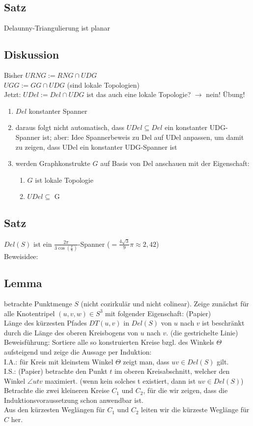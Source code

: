 \documentclass{article}
\begin{document}
\subsection*{Satz} Delaunny-Triangulierung ist planar

\subsection*{Diskussion}
Bisher $URNG := RNG \cap UDG$ \\
$UGG := GG \cap UDG$ (sind lokale Topologien) \\
Jetzt: $UDel := Del \cap UDG$ ist das auch eine lokale Topologie?
$\rightarrow$ nein! Übung!
\begin{enumerate}
	\item $Del$ konstanter Spanner
	\item daraus folgt nicht automatisch, dass $UDel \subseteq Del$ ein
	konstanter UDG-Spanner ist; aber: Idee Spannerbeweis zu Del auf UDel
	anpassen, um damit zu zeigen, dass UDel ein konstanter UDG-Spanner ist
	\item werden Graphkonstrukte $G$ auf Basis von Del anschauen mit der
	Eigenschaft: \begin{enumerate}
		\item $G$ ist lokale Topologie
		\item $UDel \subseteq$ G
	\end{enumerate}
\end{enumerate}

\subsection*{Satz}
$Del(S)$ ist ein $\frac{2\pi}{3\cos(\frac{\pi}{6})}$-Spanner ($=
\frac{4\sqrt{3}}{9}\pi \approx 2,42$) \\
Beweisidee: \\

\subsection*{Lemma}
betrachte Punktmenge $S$ (nicht cozirkulär und nicht colinear).
Zeige zunächst für alle Knotentripel $(u,v,w) \in S^3$ mit folgender
Eigenschaft: (Papier) \\
Länge des kürzesten Pfades $DT(u,v)$ in $Del(S)$ von $u$ nach $v$ ist
beschränkt durch die Länge des oberen Kreisbogens von $u$ nach $v$. (die
gestrichelte Linie) \\
Beweisführung: Sortiere alle so konstruierten Kreise bzgl. des Winkels
$\Theta$ aufsteigend und zeige die Aussage per Induktion: \\
I.A.: für Kreis mit kleinstem Winkel $\Theta$ zeigt man, dass $uv \in
Del(S)$ gilt. \\
I.S.: (Papier) betrachte den Punkt $t$ im oberen Kreisabschnitt, welcher
den Winkel $\angle utv$ maximiert. (wenn kein solches t existiert, dann
ist $uv \in Del(S)$) \\
Betrachte die zwei kleineren Kreise $C_1$ und $C_2$, für die wir zeigen,
dass die Induktionsvoraussetzung schon anwendbar ist. \\
Aus den kürzesten Weglängen für $C_1$ und $C_2$ leiten wir die kürzeste
Weglänge für $C$ her.
\end{document}
